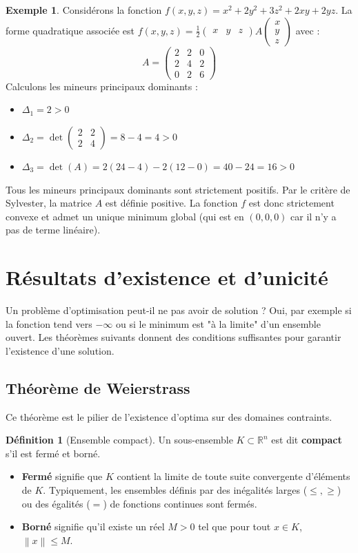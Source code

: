 \documentclass[a4paper,12pt,openany]{book}
\theoremstyle{plain}
\theoremstyle{definition}
\newtheorem{definition}[theorem]{Définition}
\newtheorem{example}[theorem]{Exemple}
\theoremstyle{remark}
\theoremstyle{nbstyle}
\newcommand{\R}{\mathbb{R}}
\newcommand{\norm}[1]{\left\lVert#1\right\rVert}
\begin{document}
	\begin{example}
		Considérons la fonction $f(x,y,z) = x^2 + 2y^2 + 3z^2 + 2xy + 2yz$.
		La forme quadratique associée est $f(x,y,z) = \frac{1}{2} \begin{pmatrix} x & y & z \end{pmatrix} A \begin{pmatrix} x \\ y \\ z \end{pmatrix}$ avec :
		$$ A = \begin{pmatrix} 2 & 2 & 0 \\ 2 & 4 & 2 \\ 0 & 2 & 6 \end{pmatrix} $$
		Calculons les mineurs principaux dominants :
		\begin{itemize}
			\item $\Delta_1 = 2 > 0$
			\item $\Delta_2 = \det \begin{pmatrix} 2 & 2 \\ 2 & 4 \end{pmatrix} = 8 - 4 = 4 > 0$
			\item $\Delta_3 = \det(A) = 2(24-4) - 2(12-0) = 40 - 24 = 16 > 0$
		\end{itemize}
		Tous les mineurs principaux dominants sont strictement positifs. Par le critère de Sylvester, la matrice $A$ est définie positive. La fonction $f$ est donc strictement convexe et admet un unique minimum global (qui est en $(0,0,0)$ car il n'y a pas de terme linéaire).
	\end{example}
	
	
	\section{Résultats d'existence et d'unicité}
	
	Un problème d'optimisation peut-il ne pas avoir de solution ? Oui, par exemple si la fonction tend vers $-\infty$ ou si le minimum est "à la limite" d'un ensemble ouvert. Les théorèmes suivants donnent des conditions suffisantes pour garantir l'existence d'une solution.
	
	\subsection{Théorème de Weierstrass}
	Ce théorème est le pilier de l'existence d'optima sur des domaines contraints.
	
	\begin{definition}[Ensemble compact]
		Un sous-ensemble $K \subset \R^n$ est dit \textbf{compact} s'il est fermé et borné.
		\begin{itemize}
			\item \textbf{Fermé} signifie que $K$ contient la limite de toute suite convergente d'éléments de $K$. Typiquement, les ensembles définis par des inégalités larges ($\le, \ge$) ou des égalités ($=$) de fonctions continues sont fermés.
			\item \textbf{Borné} signifie qu'il existe un réel $M > 0$ tel que pour tout $x \in K$, $\norm{x} \le M$.
		\end{itemize}
	\end{definition}
	
\end{document}
